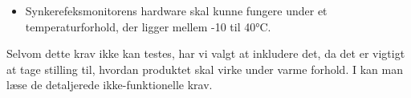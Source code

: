 \begin{itemize}
\item  Synkerefeksmonitorens hardware skal kunne fungere under et temperaturforhold, der ligger mellem -10 til 40°C.
\end{itemize}

Selvom dette krav ikke kan testes, har vi valgt at inkludere det, da det er vigtigt at tage stilling til, hvordan produktet skal virke under varme forhold. I  kan man læse de detaljerede ikke-funktionelle krav.

 


 

